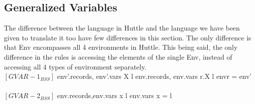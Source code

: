 \documentclass{article}
\begin{document}
\subsection{Generalized Variables}
The difference between the language in Huttle and the language we have been given to translate it too have few differences in this section. The only difference is that Env encompasses all 4 environments in Huttle. This being said, the only difference in the rules is accessing the elements of the single Env, instead of accessing all 4 types of environment separately. 
\\
$[GVAR-1_{BSS}]$
\stackedRuleWhere
{env'.records, env'.vars \vdash X \to l}
{env.records, env.vars \vdash r.X \to l}
{envr = env'}\\
\\
$[GVAR-2_{BSS}]$
\withWhere
{env.records,env.vars \vdash x \to l}
{\hspace{2cm}env.vars x = l}
\end{document}
